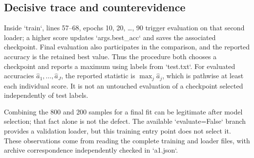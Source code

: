 \documentclass[10pt]{article}
\begin{document}
\subsection*{Decisive trace and counterevidence}
Inside `train`, lines 57–68, epochs 10, 20, …, 90 trigger evaluation on that second loader; a higher score updates `args.best\_acc` and saves the associated checkpoint. Final evaluation also participates in the comparison, and the reported accuracy is the retained best value. Thus the procedure both chooses a checkpoint and reports a maximum using labels from `test.txt`. For evaluated accuracies \(\widehat a_1,\ldots,\widehat a_J\), the reported statistic is \(\max_j\widehat a_j\), which is pathwise at least each individual score. It is not an untouched evaluation of a checkpoint selected independently of test labels.\par
Combining the 800 and 200 samples for a final fit can be legitimate after model selection; that fact alone is not the defect. The available `evaluate=False` branch provides a validation loader, but this training entry point does not select it. These observations come from reading the complete training and loader files, with archive correspondence independently checked in `a1.json`.\par
\end{document}
